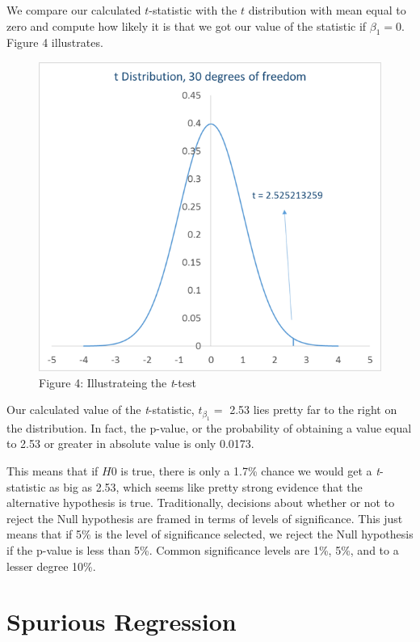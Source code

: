 \documentclass[]{book}
\theoremstyle{definition}
\theoremstyle{definition}
\theoremstyle{remark}
\begin{document}
We compare our calculated \(t\)-statistic with the \(t\) distribution
with mean equal to zero and compute how likely it is that we got our
value of the statistic if \(\beta_1 = 0\). Figure 4 illustrates.

\begin{figure}[htbp]
\centering
\includegraphics{Excel-files/BasicStatisticsand-MT_Cars_Regression_files/image027.png}
\caption{Figure 4: Illustrateing the \emph{t}-test}
\end{figure}

Our calculated value of the \emph{t}-statistic, \(t_{\beta_1} =\) 2.53
lies pretty far to the right on the distribution. In fact, the p-value,
or the probability of obtaining a value equal to 2.53 or greater in
absolute value is only 0.0173.

This means that if \(H0\) is true, there is only a 1.7\% chance we would
get a \emph{t}-statistic as big as 2.53, which seems like pretty strong
evidence that the alternative hypothesis is true. Traditionally,
decisions about whether or not to reject the Null hypothesis are framed
in terms of levels of significance. This just means that if 5\% is the
level of significance selected, we reject the Null hypothesis if the
p-value is less than 5\%. Common significance levels are 1\%, 5\%, and
to a lesser degree 10\%.

\section{Spurious Regression}\label{spurious-regression}
\end{document}

